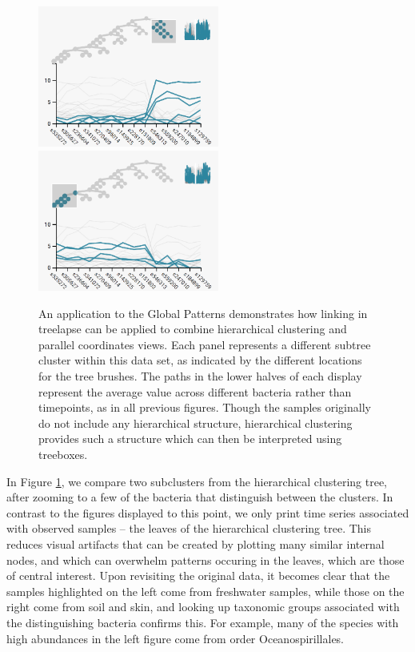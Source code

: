 \begin{figure}
  {
    \centering
    \includegraphics[width=225px]{figure/treelapse/gp_cluster1}
    \includegraphics[width=225px]{figure/treelapse/gp_cluster2}
}

\caption{An application to the Global Patterns demonstrates how linking in
  treelapse can be applied to combine hierarchical clustering and parallel
  coordinates views. Each panel represents a different subtree cluster within
  this data set, as indicated by the different locations for the tree brushes.
  The paths in the lower halves of each display represent the average value
  across different bacteria rather than timepoints, as in all previous figures.
  Though the samples originally do not include any hierarchical structure,
  hierarchical clustering provides such a structure which can then be
  interpreted using treeboxes.}\label{fig:gptimebox}
\end{figure}

In Figure \ref{fig:gptimebox}, we compare two subclusters from the
hierarchical clustering tree, after zooming to a few of the bacteria
that distinguish between the clusters. In contrast to the figures displayed to
this point, we only print time series associated with observed samples -- the
leaves of the hierarchical clustering tree. This reduces visual artifacts that
can be created by plotting many similar internal nodes, and which can overwhelm
patterns occuring in the leaves, which are those of central interest. Upon
revisiting the original data, it becomes clear that the samples highlighted on
the left come from freshwater samples, while those on the right come from soil
and skin, and looking up taxonomic groups associated with the distinguishing
bacteria confirms this. For example, many of the species with high
abundances in the left figure come from order Oceanospirillales.

